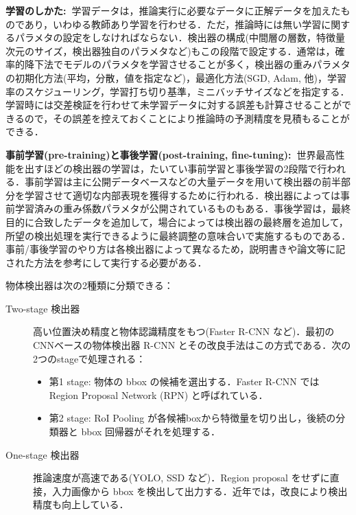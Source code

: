 \documentclass[originalpaper,fleqn]{jsaiart}     %
\begin{document}
{\bf 学習のしかた:\ }学習データは，推論実行に必要なデータに正解データを加えたものであり，いわゆる教師あり学習を行わせる．ただ，推論時には無い学習に関するパラメタの設定をしなければならない．検出器の構成(中間層の層数，特徴量次元のサイズ，検出器独自のパラメタなど)もこの段階で設定する．通常は，確率的降下法でモデルのパラメタを学習させることが多く，検出器の重みパラメタの初期化方法(平均，分散，値を指定など)，最適化方法(SGD, Adam, 他)，学習率のスケジューリング，学習打ち切り基準，ミニバッチサイズなどを指定する．学習時には交差検証を行わせて未学習データに対する誤差も計算させることができるので，その誤差を控えておくことにより推論時の予測精度を見積もることができる．

{\bf 事前学習(pre-training)と事後学習(post-training, fine-tuning):\ }世界最高性能を出すほどの検出器の学習は，たいてい事前学習と事後学習の2段階で行われる．事前学習は主に公開データベースなどの大量データを用いて検出器の前半部分を学習させて適切な内部表現を獲得するために行われる．検出器によっては事前学習済みの重み係数パラメタが公開されているものもある．事後学習は，最終目的に合致したデータを追加して，場合によっては検出器の最終層を追加して，所望の検出処理を実行できるように最終調整の意味合いで実施するものである．事前/事後学習のやり方は各検出器によって異なるため，説明書きや論文等に記された方法を参考にして実行する必要がある．

物体検出器は次の2種類に分類できる\cite{JZLYLFQ19}：
\begin{description}
    \item[Two-stage 検出器] 高い位置決め精度と物体認識精度をもつ(Faster R-CNN など)．最初のCNNベースの物体検出器 R-CNN とその改良手法はこの方式である．次の2つのstageで処理される：
    \begin{itemize}
        \item 第1 stage: 物体の bbox の候補を選出する．Faster R-CNN では Region Proposal Network (RPN) と呼ばれている．
        \item 第2 stage: RoI Pooling が各候補boxから特徴量を切り出し，後続の分類器と bbox 回帰器がそれを処理する．
    \end{itemize}
    \item[One-stage 検出器] 推論速度が高速である(YOLO, SSD など)．Region proposal をせずに直接，入力画像から bbox を検出して出力する．近年では，改良により検出精度も向上している．
\end{description}
\end{document}
